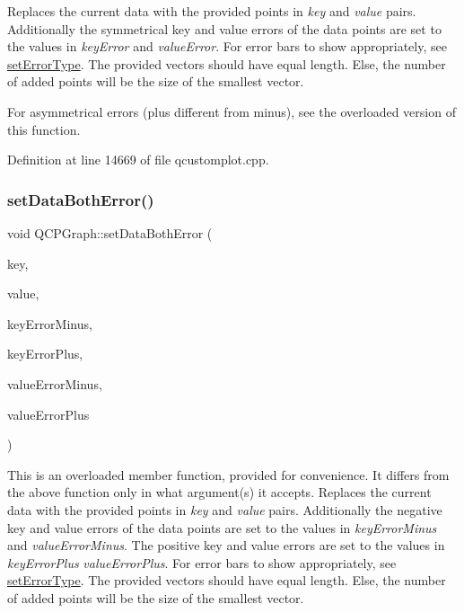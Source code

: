 Replaces the current data with the provided points in {\itshape key} and {\itshape value} pairs. Additionally the symmetrical key and value errors of the data points are set to the values in {\itshape key\+Error} and {\itshape value\+Error}. For error bars to show appropriately, see \hyperlink{class_q_c_p_graph_ac3614d799c3894f2bc646e99c7f73d38}{set\+Error\+Type}. The provided vectors should have equal length. Else, the number of added points will be the size of the smallest vector.

For asymmetrical errors (plus different from minus), see the overloaded version of this function. 

Definition at line 14669 of file qcustomplot.\+cpp.

\mbox{\label{class_q_c_p_graph_abb75736ecdbf6e6a7501e1da64fb18cf}} 
\subsubsection{\texorpdfstring{set\+Data\+Both\+Error()}{setDataBothError()}\hspace{0.1cm}{\footnotesize\ttfamily [2/2]}}
{\footnotesize\ttfamily void Q\+C\+P\+Graph\+::set\+Data\+Both\+Error (\begin{DoxyParamCaption}\item[{const Q\+Vector$<$ double $>$ \&}]{key,  }\item[{const Q\+Vector$<$ double $>$ \&}]{value,  }\item[{const Q\+Vector$<$ double $>$ \&}]{key\+Error\+Minus,  }\item[{const Q\+Vector$<$ double $>$ \&}]{key\+Error\+Plus,  }\item[{const Q\+Vector$<$ double $>$ \&}]{value\+Error\+Minus,  }\item[{const Q\+Vector$<$ double $>$ \&}]{value\+Error\+Plus }\end{DoxyParamCaption})}

This is an overloaded member function, provided for convenience. It differs from the above function only in what argument(s) it accepts. Replaces the current data with the provided points in {\itshape key} and {\itshape value} pairs. Additionally the negative key and value errors of the data points are set to the values in {\itshape key\+Error\+Minus} and {\itshape value\+Error\+Minus}. The positive key and value errors are set to the values in {\itshape key\+Error\+Plus} {\itshape value\+Error\+Plus}. For error bars to show appropriately, see \hyperlink{class_q_c_p_graph_ac3614d799c3894f2bc646e99c7f73d38}{set\+Error\+Type}. The provided vectors should have equal length. Else, the number of added points will be the size of the smallest vector. 

